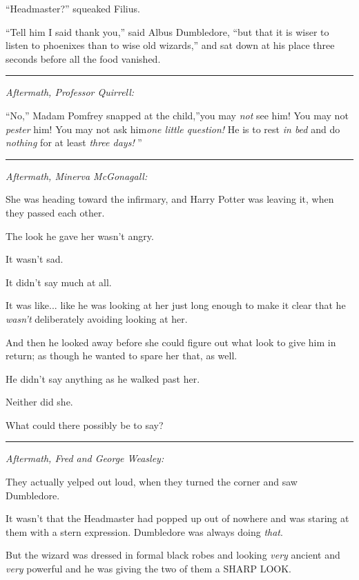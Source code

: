 ``Headmaster?'' squeaked Filius.

``Tell him I said thank you,'' said Albus Dumbledore, ``but that it is
wiser to listen to phoenixes than to wise old wizards,'' and sat down at
his place three seconds before all the food vanished.

\begin{center}\rule{3in}{0.4pt}\end{center}

\emph{Aftermath, Professor Quirrell:}

``No,'' Madam Pomfrey snapped at the child,''you may \emph{not} see him!
You may not \emph{pester} him! You may not ask him\emph{one little
question!} He is to rest \emph{in bed} and do \emph{nothing} for at
least \emph{three days!} ''

\begin{center}\rule{3in}{0.4pt}\end{center}

\emph{Aftermath, Minerva McGonagall:}

She was heading toward the infirmary, and Harry Potter was leaving it,
when they passed each other.

The look he gave her wasn't angry.

It wasn't sad.

It didn't say much at all.

It was like... like he was looking at her just long enough to make
it clear that he \emph{wasn't} deliberately avoiding looking at her.

And then he looked away before she could figure out what look to give
him in return; as though he wanted to spare her that, as well.

He didn't say anything as he walked past her.

Neither did she.

What could there possibly be to say?

\begin{center}\rule{3in}{0.4pt}\end{center}

\emph{Aftermath, Fred and George Weasley:}

They actually yelped out loud, when they turned the corner and saw
Dumbledore.

It wasn't that the Headmaster had popped up out of nowhere and was
staring at them with a stern expression. Dumbledore was always doing
\emph{that}.

But the wizard was dressed in formal black robes and looking \emph{very}
ancient and \emph{very} powerful and he was giving the two of them a
SHARP LOOK.

